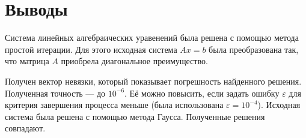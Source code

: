 \chapter*{Выводы}

Система линейных алгебраических уравенений была решена с помощью метода простой итерации.
Для этого исходная система $Ax = b$ была преобразована так,
что матрица $A$ приобрела диагональное преимущество.

Получен вектор невязки, который показывает погрешность найденного решения.
Полученная точность --- до $10^{-6}$.
Её можно повысить, если задать ошибку $ \varepsilon $ для критерия завершения процесса меньше
(была использована $ \varepsilon = 10^{-4}$).
Исходная система была решена с помощью метода Гаусса.
Полученные решения совпадают.



